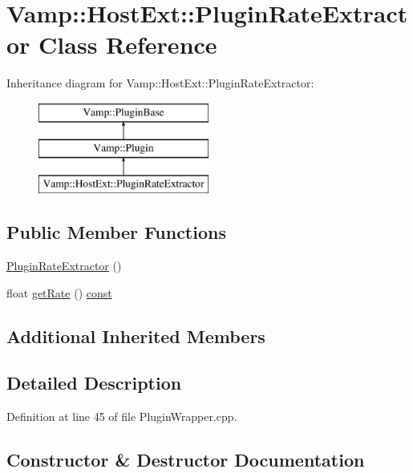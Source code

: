 \hypertarget{class_vamp_1_1_host_ext_1_1_plugin_rate_extractor}{}\section{Vamp\+:\+:Host\+Ext\+:\+:Plugin\+Rate\+Extractor Class Reference}
\label{class_vamp_1_1_host_ext_1_1_plugin_rate_extractor}
Inheritance diagram for Vamp\+:\+:Host\+Ext\+:\+:Plugin\+Rate\+Extractor\+:\begin{figure}[H]
\begin{center}
\leavevmode
\includegraphics[height=3.000000cm]{class_vamp_1_1_host_ext_1_1_plugin_rate_extractor}
\end{center}
\end{figure}
\subsection*{Public Member Functions}
\begin{DoxyCompactItemize}
\item 
\hyperlink{class_vamp_1_1_host_ext_1_1_plugin_rate_extractor_a2ca2ad6683e73737a7c9b0f9b1a35f00}{Plugin\+Rate\+Extractor} ()
\item 
float \hyperlink{class_vamp_1_1_host_ext_1_1_plugin_rate_extractor_ad6f14e142d960be479b291291cf8d735}{get\+Rate} () \hyperlink{getopt1_8c_a2c212835823e3c54a8ab6d95c652660e}{const} 
\end{DoxyCompactItemize}
\subsection*{Additional Inherited Members}


\subsection{Detailed Description}


Definition at line 45 of file Plugin\+Wrapper.\+cpp.



\subsection{Constructor \& Destructor Documentation}
